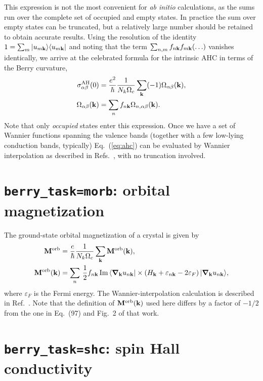 This expression is not the most convenient for {\it ab initio}
calculations, as the sums run over the complete set of occupied and
empty states. In practice the sum over empty states can be truncated,
but a relatively large number should be retained to obtain accurate
results. Using the resolution of the identity $1=\sum_m \vert u_{m\bf
  k}\rangle \langle u_{m\bf k}\vert$ and noting that the term
$\sum_{n,m}f_{n\bf k}f_{m\bf k}(\ldots)$ vanishes identically, we
arrive at the celebrated formula for the intrinsic AHC in terms of the
Berry curvature,
%
\begin{align}
\label{eq:ahc}
\sigma^{\rm AH}_{\alpha\beta}(0)&=\frac{e^2}{\hbar}
\frac{1}{N_k\Omega_c}\sum_{\bf k}(-1)\Omega_{\alpha\beta}({\bf k}),\\
\label{eq:curv-occ}
\Omega_{\alpha\beta}({\bf k})&=\sum_n f_{n\bf k}\Omega_{n,\alpha\beta}({\bf k}).
\end{align}
%
Note that only {\it occupied} states enter this expression.  Once we
have a set of Wannier functions spanning the valence bands (together
with a few low-lying conduction bands, typically) Eq.~(\ref{eq:ahc})
can be evaluated by Wannier interpolation as described in
Refs.~\cite{wang-prb06,lopez-prb12}, with no truncation involved.


\section{{\tt berry\_task=morb}: orbital magnetization}

The ground-state orbital magnetization of a crystal is given
by~\cite{xiao-rmp10,ceresoli-prb06}
%
\begin{align}
\label{eq:morb}
{\bf M}^{\rm orb}&=\frac{e}{\hbar}
\frac{1}{N_k\Omega_c}\sum_{\bf k}{\bf M}^{\rm orb}({\bf k}),\\
\label{eq:morb-k}
{\bf M}^{\rm orb}({\bf k})&=
\sum_n\,\frac{1}{2}f_{n{\bf k}}\,
{\rm Im}\,\langle \bm{\nabla}_{\bf k}u_{n{\bf k}}\vert
\times
\left(H_{\bf k}+\varepsilon_{n{\bf k}}-2\varepsilon_F\right)
\vert \bm{\nabla}_{\bf k}u_{n{\bf k}}\rangle,
\end{align}
%
where $\varepsilon_F$ is the Fermi energy. The Wannier-interpolation
calculation is described in Ref.~\cite{lopez-prb12}. Note that the
definition of ${\bf M}^{\rm orb}({\bf k})$ used here differs by a
factor of $-1/2$ from the one in Eq.~(97) and Fig.~2 of that work.

\section{{\tt berry\_task=shc}: spin Hall conductivity}
\label{sec:shc}

